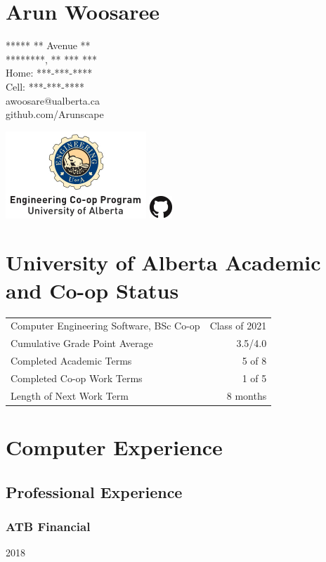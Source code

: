 \documentclass[letterpaper]{article}
\begin{document}
\section{Arun Woosaree}
***** ** Avenue **\\
********, ** *** ***\\
Home: ***-***-****\\
Cell: ***-***-****\\
awoosare@ualberta.ca\\
github.com/Arunscape

\includegraphics{cooplogo.jpg}
\includegraphics{githublogo.png}

\section{University of Alberta Academic and Co-op Status}
\begin{table}[h!]
\begin{tabular}{lr}
Computer Engineering Software, BSc Co-op & Class of 2021 \\
Cumulative Grade Point Average           & 3.5/4.0       \\
Completed Academic Terms                 & 5 of 8        \\
Completed Co-op Work Terms               & 1 of 5        \\
Length of Next Work Term                 & 8 months     
\end{tabular}
\end{table}

\section{Computer Experience}

  \subsection{Professional Experience}
    \subsubsection{ATB Financial} \hfill 2018
\end{document}
